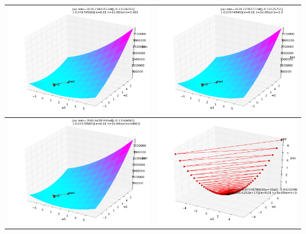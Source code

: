 \begin{itemize}
\begin{table}[ht]
\centering
\begin{tabular}{|c|c|}
\hline
\includegraphics[width=8cm]{JW1.png}&\includegraphics[width=8cm]{JW2.png}\\
\hline
\includegraphics[width=8cm]{JW3.png}&\includegraphics[width=8cm]{JW4.png}\\

\end{tabular}
\end{table}
\end{itemize}
